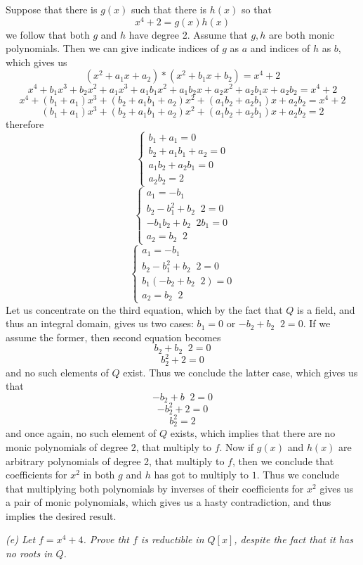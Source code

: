 \documentclass[11pt,oneside,titlepage]{book}
\DeclareMathOperator \inv {^{-1}}
\begin{document}
Suppose that there is $g(x)$ such that there is $h(x)$
so that
$$x^4 + 2 = g(x) h(x)$$
we follow that both $g$ and $h$ have degree 2. Assume that $g, h$ are
both monic polynomials. Then we can give indicate indices of $g$ as $a$ and
indices of $h$ as $b$, which gives us
$$(x^2 + a_1 x + a_2) * (x^2 + b_1 x + b_2) = x^4 + 2$$
$$x^4 + b_1 x^3 + b_2 x^2 + a_1 x^3 + a_1 b_1 x^2 + a_1 b_2 x + a_2 x^2 + a_2 b_1 x + a_2 b_2 = x^4 + 2$$
$$x^4 + (b_1 + a_1)x^3 + (b_2 + a_1 b_1 + a_2)x^2 + (a_1 b_2 + a_2 b_1) x + a_2 b_2 = x^4 + 2$$
$$(b_1 + a_1)x^3 + (b_2 + a_1 b_1 + a_2)x^2 + (a_1 b_2 + a_2 b_1) x + a_2 b_2 = 2$$
therefore
$$
\begin{cases}
  b_1 + a_1 = 0 \\
  b_2 + a_1b_1 + a_2 = 0 \\
  a_1 b_2 + a_2 b_1 = 0 \\
  a_2 b_2 = 2
\end{cases}
$$
$$
\begin{cases}
  a_1 = -b_1 \\
  b_2 -  b_1^2 + b_2\inv 2 = 0 \\
  -b_1 b_2 +  b_2\inv 2 b_1 = 0 \\
  a_2 = b_2\inv 2
\end{cases}
$$
$$
\begin{cases}
  a_1 = -b_1 \\
  b_2 -  b_1^2 + b_2\inv 2 = 0 \\
  b_1 (- b_2 +  b_2\inv 2) = 0 \\
  a_2 = b_2\inv 2
\end{cases}
$$
Let us concentrate on the third equation, which by the fact that $Q$ is a field,
and thus an integral domain, gives us two cases: $b_1 = 0$ or $-b_2 +
b_2\inv 2 = 0$. If we assume the former, then second equation becomes
$$b_2 + b_2 \inv 2 = 0$$
$$b_2^2 + 2 = 0$$
and no such elements of $Q$ exist. Thus we conclude the latter case, which gives us that
$$- b_2  + b\inv 2 = 0$$
$$- b_2^2  + 2 = 0$$
$$b_2^2  = 2$$
and once again, no such element of $Q$ exists, which implies that
there are no monic polynomials of degree $2$, that multiply to $f$. Now if
$g(x)$ and $h(x)$ are arbitrary polynomials of degree 2, that multiply to $f$,
then we conclude that coefficients for $x^2$ in both $g$ and $h$ has got to
multiply to $1$. Thus we conclude that multiplying both polynomials by
inverses of their coefficients for $x^2$ gives us a pair of monic
polynomials, which gives us a hasty contradiction, and thus implies the desired
result.


\textit{(e) Let $f = x^4 + 4$. Prove tht $f$ is reductible in $Q[x]$,
  despite the fact that it has no roots in $Q$.}
\end{document}
